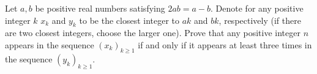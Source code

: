 Let $a,b$ be positive real numbers satisfying $2ab=a-b$. Denote for any positive integer $k$ $x_k$ and $y_k$ to be the closest integer to $ak$ and $bk$, respectively (if there are two closest integers, choose the larger one). Prove that any positive integer $n$ appears in the sequence $(x_k)_{k\ge 1}$ if and only if it appears at least three times in the sequence $(y_k)_{k\ge 1}$.